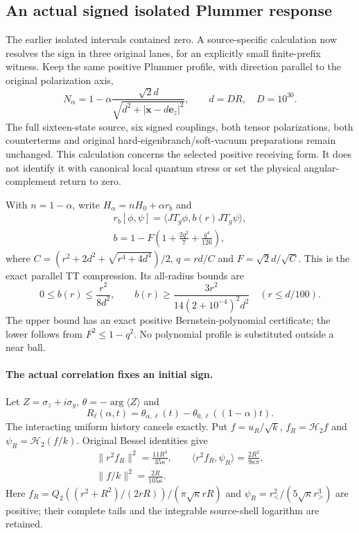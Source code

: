 \subsection{An actual signed isolated Plummer response}
The earlier isolated intervals contained zero. A source-specific calculation
now resolves the sign in three original lanes, for an explicitly small
finite-prefix witness. Keep the same positive Plummer profile, with direction
parallel to the original polarization axis,
\[
 N_\alpha=1-\alpha\frac{\sqrt2d}{\sqrt{d^2+|\mathbf x-d\mathbf e_z|^2}},
 \qquad d=DR,\quad D=10^{30}.
\]
The full sixteen-state source, six signed couplings, both tensor
polarizations, both counterterms and original hard-eigenbranch/soft-vacuum
preparations remain unchanged. This calculation concerns the selected
positive receiving form. It does not identify it with canonical local
quantum stress or set the physical angular-complement return to zero.

With $n=1-\alpha$, write $H_\alpha=nH_0+\alpha r_b$ and
\[
 \begin{gathered}
 r_b[\phi,\psi]=\langle JT_g\phi,b(r)JT_g\psi\rangle,\\
 b=1-F\left(1+\frac{2q^2}{7}+\frac{q^4}{126}\right),
 \end{gathered}
\]
where $C=(r^2+2d^2+\sqrt{r^4+4d^4})/2$, $q=rd/C$ and
$F=\sqrt2d/\sqrt C$. This is the exact parallel TT compression.
Its all-radius bounds are
\[
 0\le b(r)\le\frac{r^2}{8d^2},\qquad
 b(r)\ge\frac{3r^2}{14(2+10^{-4})^2d^2}\quad(r\le d/100).
\]
The upper bound has an exact positive Bernstein-polynomial certificate;
the lower follows from $F^2\le1-q^2$. No polynomial profile is substituted
outside a near ball.

\paragraph{The actual correlation fixes an initial sign.}
Let $Z=\sigma_z+i\sigma_y$, $\theta=-\arg\langle Z\rangle$ and
\[
 R_\ell(\alpha,t)=\theta_{\alpha,\ell}(t)
                    -\theta_{0,\ell}((1-\alpha)t).
\]
The interacting uniform history cancels exactly. Put
$f=u_R/\sqrt k$, $f_R=\mathcal H_2f$ and
$\psi_R=\mathcal H_2(f/k)$. Original Bessel identities give
\[
 \begin{gathered}
 \|r^2f_R\|^2=\frac{11R^3}{35\kappa},\qquad
 \langle r^2f_R,\psi_R\rangle=\frac{2R^2}{9\kappa\pi},\\
 \|f/k\|^2=\frac{2R}{105\kappa}.
 \end{gathered}
\]
Here $f_R=Q_2((r^2+R^2)/(2rR))/(\pi\sqrt\kappa rR)$ and
$\psi_R=r_<^2/(5\sqrt\kappa r_>^3)$ are positive; their complete tails
and the integrable source-shell logarithm are retained.

